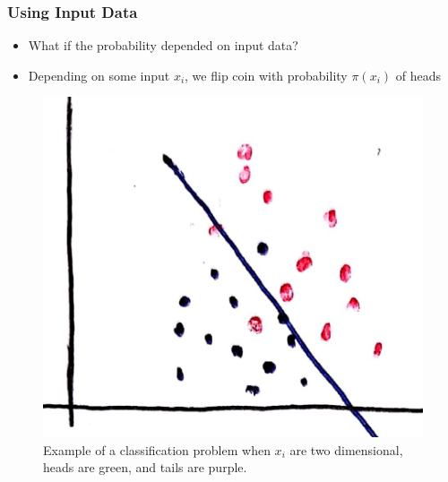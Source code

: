\documentclass[10pt,mathserif]{beamer}
\begin{document}
\begin{frame}
  \frametitle{Using Input Data}
  \begin{itemize}
  \item What if the probability depended on input data?
  \item Depending on some input $x_i$, we flip coin with probability
    $\pi\left(x_i\right)$ of heads
  \end{itemize}
  \begin{figure}
    \centering
    \includegraphics[width=0.3\paperwidth]{figure/logistic_scatter_plane}
    \caption{Example of a classification problem when $x_i$ are two dimensional,
      heads are green, and tails are purple. \label{fig:logistic_scatter} }
  \end{figure}
\end{frame}
\end{document}
